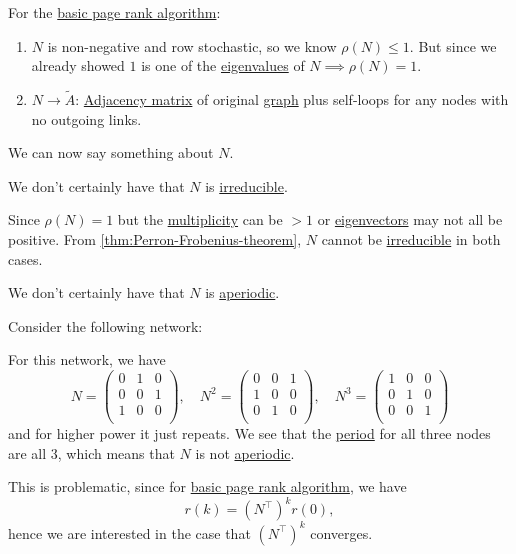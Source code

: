 \begin{prev}
	For the \hyperref[algo:basic-page-rank-algorithm]{basic page rank algorithm}:
	\begin{enumerate}
		\item \(N\) is non-negative and row stochastic, so we know \(\rho (N) \leq 1\). But since we already showed \(1\) is one of the \hyperref[def:eigenvalue]{eigenvalues} of \(N \implies \rho(N) = 1\).
		\item \(N \to \widetilde{A}\): \hyperref[def:adjacency-matrix]{Adjacency matrix} of original \hyperref[def:graph]{graph} plus self-loops for any nodes with no outgoing links.
	\end{enumerate}
\end{prev}

We can now say something about \(N\).

\begin{remark}
	We don't certainly have that \(N\) is \hyperref[def:irreducible]{irreducible}.
\end{remark}
\begin{explanation}
	Since \(\rho (N) = 1\) but the \hyperref[def:multiplicity]{multiplicity} can be \(> 1\) or \hyperref[def:eigenvector]{eigenvectors} may not all be positive.
	From \autoref{thm:Perron-Frobenius-theorem}, \(N\) cannot be \hyperref[def:irreducible]{irreducible} in both cases.
\end{explanation}

\begin{remark}
	We don't certainly have that \(N\) is \hyperref[def:aperiodic]{aperiodic}.
\end{remark}
\begin{explanation}
	Consider the following network:
	\begin{center}
	\end{center}
	For this network, we have
	\[
		N=\begin{pmatrix}
			0 & 1 & 0 \\
			0 & 0 & 1 \\
			1 & 0 & 0 \\
		\end{pmatrix},\quad N^2 = \begin{pmatrix}
			0 & 0 & 1 \\
			1 & 0 & 0 \\
			0 & 1 & 0 \\
		\end{pmatrix}, \quad N^3 = \begin{pmatrix}
			1 & 0 & 0 \\
			0 & 1 & 0 \\
			0 & 0 & 1 \\
		\end{pmatrix}
	\]
	and for higher power it just repeats. We see that the \hyperref[def:period]{period} for all three nodes	are all \(3\),
	which means that \(N\) is not \hyperref[def:aperiodic]{aperiodic}.
\end{explanation}
This is problematic, since for \hyperref[algo:basic-page-rank-algorithm]{basic page rank algorithm}, we have
\[
	r(k) = (N^{\top} )^k r(0),
\]
hence we are interested in the case that \((N^{\top})^k\) converges.


